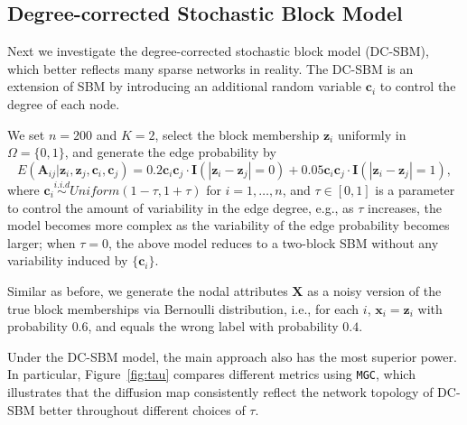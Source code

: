 \documentclass[11pt]{article}
\theoremstyle{definition}
\begin{document}
\subsection{Degree-corrected Stochastic Block Model}
Next we investigate the degree-corrected stochastic block model (DC-SBM), which better reflects many sparse networks in reality. The DC-SBM is an extension of SBM by introducing an additional random variable $\mathbf{c}_{i}$ to control the degree of each node. 

We set $n=200$ and $K=2$, select the block membership $\mathbf{z}_i$ uniformly in $\Omega=\{0,1\}$, and generate the edge probability by  
\vspace*{-0.4cm}
\begin{equation}
E( \mathbf{A}_{ij} | \mathbf{z}_{i}, \mathbf{z}_{j},\mathbf{c}_{i},\mathbf{c}_{j} )  = 0.2 \mathbf{c}_{i} \mathbf{c}_{j} \cdot \mathbf{I}( |\mathbf{z}_{i} - \mathbf{z}_{j}| = 0 ) + 0.05 \mathbf{c}_{i} \mathbf{c}_{j} \cdot \mathbf{I}(|\mathbf{z}_{i} - \mathbf{z}_{j}| = 1),
\label{eq:tau}
\end{equation} 
where $\mathbf{c}_{i} \overset{i.i.d}{\sim} Uniform(1 - \tau, 1 + \tau)$ for $i = 1, \ldots, n$, and $\tau \in [0, 1]$ is a parameter to control the amount of variability in the edge degree, e.g., as $\tau$ increases, the model becomes more complex as the variability of the edge probability becomes larger; when $\tau=0$, the above model reduces to a two-block SBM without any variability induced by $\{ \mathbf{c}_{i} \}$. 

Similar as before, we generate the nodal attributes $\mathbf{X}$ as a noisy version of the true block memberships via Bernoulli distribution, i.e., for each $i$, $\mathbf{x}_{i}= \mathbf{z}_{i}$ with probability $0.6$, and equals the wrong label with probability $0.4$.

Under the DC-SBM model, the main approach also has the most superior power. In particular, Figure~\ref{fig:tau} compares different metrics using \texttt{MGC}, which illustrates that the diffusion map consistently reflect the network topology of DC-SBM better throughout different choices of $\tau$.

\end{document}
